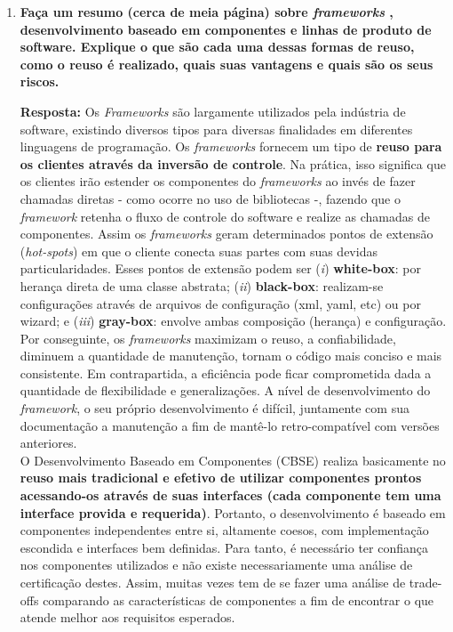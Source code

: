 \documentclass[12pt, a4paper]{article}
\newcommand{\tit}[1]{\textit{#1}}
\newcommand{\tb}[1]{\textbf{#1}}
\newcommand{\iitem}[1]{(\tit{#1})}
\newcommand{\question}[1]{\item \tb{#1}}
\newcommand{\answer}[1]{\par \tb{Resposta:} #1}
\begin{document}
\begin{enumerate}[label=\textbf{\arabic*.}]
        \clearpage
        \newcommand{\fw}{\tit{framework} }
        \newcommand{\fws}{\tit{frameworks} }
        \question{Faça um resumo (cerca de meia página) sobre \fws, desenvolvimento baseado em componentes e linhas de produto de software. Explique o que são cada uma dessas formas de reuso, como o reuso é realizado, quais suas vantagens e quais são os seus riscos.}
        \answer{ 
            Os \tit{Frameworks} são largamente utilizados pela indústria de software, existindo diversos tipos para diversas finalidades em diferentes linguagens de programação. Os \fws fornecem um tipo de \tb{reuso para os clientes através da inversão de controle}. Na prática, isso significa que os clientes irão estender os componentes do \fws ao invés de fazer chamadas diretas - como ocorre no uso de bibliotecas -, fazendo que o \fw retenha o fluxo de controle do software e realize as chamadas de componentes. Assim os \fws geram determinados pontos de extensão (\tit{hot-spots}) em que o cliente conecta suas partes com suas devidas particularidades. Esses pontos de extensão podem ser \iitem{i} \tb{white-box}: por herança direta de uma classe abstrata; \iitem{ii} \tb{black-box}: realizam-se configurações através de arquivos de configuração (xml, yaml, etc) ou por wizard; e \iitem{iii} \tb{gray-box}: envolve ambas composição (herança) e configuração. Por conseguinte, os \fws maximizam o reuso, a confiabilidade, diminuem a quantidade de manutenção, tornam o código mais conciso e mais consistente. Em contrapartida, a eficiência pode ficar comprometida dada a quantidade de flexibilidade e generalizações. A nível de desenvolvimento do \tit{framework}, o seu próprio desenvolvimento é difícil, juntamente com sua documentação a manutenção a fim de mantê-lo retro-compatível com versões anteriores.  \\
            O Desenvolvimento Baseado em Componentes (CBSE) realiza basicamente no \tb{reuso mais tradicional e efetivo de utilizar componentes prontos acessando-os através de suas interfaces (cada componente tem uma interface provida e requerida)}. Portanto, o desenvolvimento é baseado em componentes independentes entre si, altamente coesos, com implementação escondida e interfaces bem definidas. Para tanto, é necessário ter confiança nos componentes utilizados e não existe necessariamente uma análise de certificação destes. Assim, muitas vezes tem de se fazer uma análise de trade-offs comparando as características de componentes a fim de encontrar o que atende melhor aos requisitos esperados. \\
}
\end{enumerate}
\end{document}
